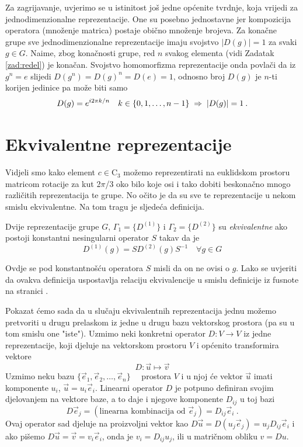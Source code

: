 Za zagrijavanje, uvjerimo se u istinitost još jedne općenite tvrdnje,
koja vrijedi za jednodimenzionalne reprezentacije.
One su posebno jednostavne jer
 kompozicija operatora (množenje matrica) postaje obično množenje
 brojeva.
Za konačne grupe sve jednodimenzionalne reprezentacije imaju svojstvo $|D(g)|=1$
za svaki $g \in G$.
Naime, zbog konačnosti grupe, red $n$ svakog elementa 
(vidi Zadatak \ref{zad:redel}) je konačan. Svojstvo homomorfizma
reprezentacije onda povlači da iz $g^n=e$ slijedi $D(g^n)=
  D(g)^n=D(e)=1$, odnosno broj $D(g)$ je $n$-ti korijen jedinice pa može
  biti samo
\begin{equation*}
 D(g)= e^{i 2\pi k/n} \quad k\in\{0,1,\ldots, n-1\} \;\Rightarrow\; |D(g)|=1 \:.
\end{equation*}

\section{Ekvivalentne reprezentacije}

Vidjeli smo kako element $c \in \mathrm{C}_3$ možemo reprezentirati na
euklidskom prostoru matricom rotacije za kut 2$\pi$/3 oko bilo
koje osi i tako dobiti beskonačno mnogo različitih reprezentacija te
grupe. No očito je da su sve te reprezentacije u nekom smislu
ekvivalentne. Na tom tragu je sljedeća definicija.

\begin{definicija}
Dvije reprezentacije grupe $G$, $\Gamma_{1}=\{D^{(1)}\}$ i $\Gamma_{2}=\{D^{(2)}\}$ su
\emph{ekvivalentne} ako postoji konstantni nesingularni operator
$S$ takav da je
\begin{equation}
        D^{(1)}(g) = S D^{(2)}(g) S^{-1} \quad \forall g \in G
        \label{eq:ekvivrep}
\end{equation}
\end{definicija}
Ovdje se pod konstantnošću operatora $S$ misli da on ne ovisi o $g$.
Lako se uvjeriti da ovakva definicija uspostavlja relaciju ekvivalencije
u smislu definicije iz fusnote na stranici \pageref{fn:ekviv}.

Pokazat ćemo sada da u slučaju ekvivalentnih reprezentacija jednu
možemo pretvoriti u drugu prelaskom iz jedne u drugu bazu vektorskog
prostora (pa su u tom smislu one "iste"). Uzmimo neki konkretni operator
$D:V \to V$ iz jedne reprezentacije, koji djeluje na vektorskom prostoru
$V$ i općenito transformira vektore
\begin{equation}
D:\vec{u}\mapsto \vec{v}
\end{equation}
Uzmimo neku bazu $\{\vec{e}_1, \vec{e}_2, \ldots, \vec{e}_n\}\quad$ prostora
$V$ i u njoj će vektor $\vec{u}$ imati komponente $u_i$, 
$\vec{u} =  u_i \vec{e}_i$.
Linearni operator $D$ je potpuno definiran svojim djelovanjem na
vektore baze, a to daje i njegove komponente $D_{ij}$ u toj bazi
\begin{equation}
D \vec{e}_j = (\textrm{linearna kombinacija od } \vec{e}_j) = D_{ij}
  \vec{e}_i \:.
\end{equation}
Ovaj operator sad djeluje na proizvoljni vektor kao
  $D\vec{u}=D( u_j \vec{e}_j)= u_j D_{ij} \vec{e}_i$ 
i ako pišemo $D\vec{u}=\vec{v}=v_i \vec{e}_i$, onda je
$v_i = D_{ij} u_j$, ili u matričnom obliku $v=Du$.

